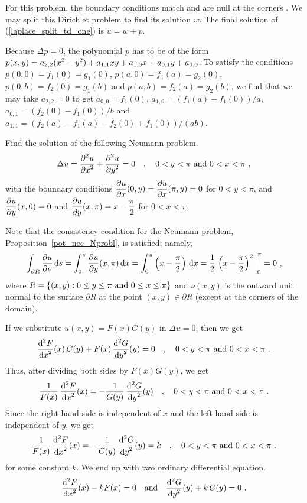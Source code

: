 \begin{rmk}
For this problem, the boundary conditions match and are null at the
corners .  We may split this Dirichlet problem to find its solution
$w$.  The final solution of (\ref{laplace_split_td_one}) is $u = w + p$.

Because $\Delta p = 0$, the polynomial $p$ has to be of the form
$\displaystyle p(x,y) = a_{2,2}(x^2-y^2) + a_{1,1}xy + a_{1,0}x
+ a_{0,1}y + a_{0,0}$.
To satisfy the conditions
$p(0,0) = f_1(0) = g_1(0)$, $p(a,0) = f_1(a) = g_2(0)$,
$p(0,b) = f_2(0) = g_1(b)$ and $p(a,b) = f_2(a) = g_2(b)$, we find
that we may take $a_{2,2} = 0$ to get
$a_{0,0} = f_1(0)$, $a_{1,0} = (f_1(a) - f_1(0))/a$,
$a_{0,1} = (f_2(0) - f_1(0))/b$ and
$a_{1,1} = (f_2(a) - f_1(a) -f_2(0) + f_1(0))/(ab)$.
\label{laplace_split_td}
\end{rmk}

\begin{egg}
Find the solution of the following Neumann problem.
\[
\Delta u = \frac{\displaystyle \partial^{2}{u}} {\displaystyle \partial x^{2}} + \frac{\displaystyle \partial^{2}{u}} {\displaystyle \partial y^{2}} = 0 \quad ,
\quad 0 < y < \pi \ \text{and} \ 0 < x < \pi \ ,
\]
with the boundary conditions
$\displaystyle \frac{\partial{u}}{\partial x}(0,y) = \frac{\partial{u}}{\partial x}(\pi,y) = 0$
for $0<y<\pi$, and
$\displaystyle \frac{\partial{u}}{\partial y}(x,0) =0$ and
$\displaystyle \frac{\partial{u}}{\partial y}(x,\pi) = x - \frac{\pi}{2}$
for $0<x<\pi$.

Note that the consistency condition for the Neumann problem,
Proposition~\ref{pot_nec_Nprobl}, is satisfied; namely,
\begin{equation} \label{laplace_spv_npc}
\int_{\partial R} \pdydx{u}{\nu} \dx{s} = \int_0^\pi \pdydx{u}{y}(x,\pi) \dx{x}
= \int_0^\pi \left(x-\frac{\pi}{2}\right)\dx{x}
= \frac{1}{2}\,\left( x - \frac{\pi}{2}\right)^2\bigg|_0^\pi = 0 \ ,
\end{equation}
where
$\displaystyle R = \{ (x,y) : 0 \leq y \leq \pi \ \text{and}
\ 0 \leq x \leq \pi\}$
and $\nu(x,y)$ is the outward unit normal to the surface $\partial R$
at the point $(x,y) \in \partial R$ (except at the corners of the domain).

If we substitute $u(x,y) = F(x)G(y)$ in $\Delta u = 0$, then we get
\[
\frac{\displaystyle \mathrm{d}^{2}{F}} {\displaystyle \mathrm{d}{x}^{2}}(x)\,G(y) + F(x)\,\frac{\displaystyle \mathrm{d}^{2}{G}} {\displaystyle \mathrm{d}{y}^{2}}(y) = 0 \quad ,
\quad 0 < y < \pi \ \text{and} \ 0 < x < \pi \ .
\]
Thus, after dividing both sides by $F(x)G(y)$, we get
\[
\frac{1}{F(x)}\,\dydxn{F}{x}{2}(x) = -\frac{1}{G(y)}\,\dydxn{G}{y}{2}(y)
\quad , \quad 0 < y < \pi \ \text{and} \ 0 < x < \pi \ .
\]
Since the right hand side is independent of $x$ and the left hand side
is independent of $y$, we get
\[
\frac{1}{F(x)}\,\dydxn{F}{x}{2}(x) = -\frac{1}{G(y)}\,\dydxn{G}{y}{2}(y)
= k  \quad , \quad 0 < y < \pi \ \text{and} \ 0 < x < \pi \ .
\]
for some constant $k$.  We end up with two ordinary differential equation.
\begin{equation} \label{laplace_spv_egg1_ode}
\frac{\displaystyle \mathrm{d}^{2}{F}} {\displaystyle \mathrm{d}{x}^{2}}(x) -k F(x) = 0 \quad \text{and}
\quad \frac{\displaystyle \mathrm{d}^{2}{G}} {\displaystyle \mathrm{d}{y}^{2}}(y) + k\,G(y) = 0 \ .
\end{equation}


\end{egg}
